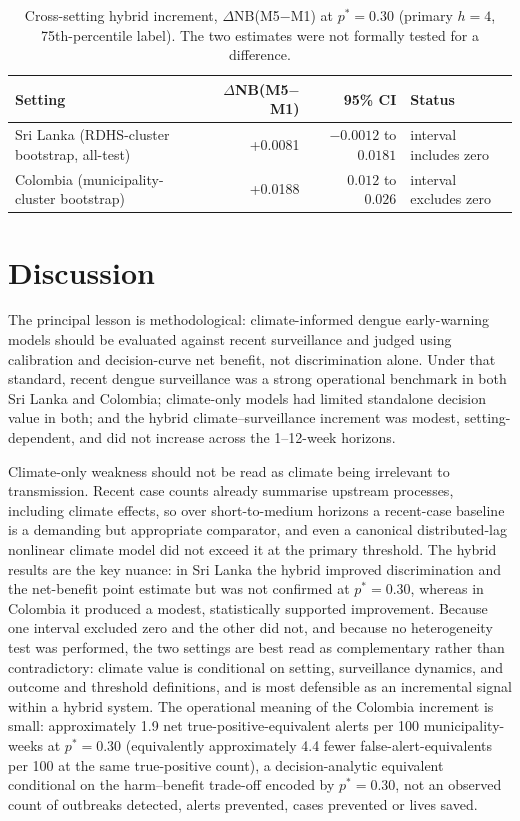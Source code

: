\documentclass[11pt,a4paper]{article}
\begin{document}
\begin{table}[htbp]
\centering
\caption{Cross-setting hybrid increment, $\Delta$NB(M5$-$M1) at $p^*=0.30$ (primary $h=4$, 75th-percentile label). The two estimates were not formally tested for a difference.}
\label{tab:crosssetting}
\small
\begin{tabular}{lrrl}
\toprule
Setting & $\Delta$NB(M5$-$M1) & 95\% CI & Status \\
\midrule
Sri Lanka (RDHS-cluster bootstrap, all-test) & +0.0081 & $-0.0012$ to $0.0181$ & interval includes zero \\
Colombia (municipality-cluster bootstrap) & +0.0188 & $0.012$ to $0.026$ & interval excludes zero \\
\bottomrule
\end{tabular}
\end{table}

\section{Discussion}

The principal lesson is methodological: climate-informed dengue early-warning models should be evaluated against recent surveillance and judged using calibration and decision-curve net benefit, not discrimination alone. Under that standard, recent dengue surveillance was a strong operational benchmark in both Sri Lanka and Colombia; climate-only models had limited standalone decision value in both; and the hybrid climate--surveillance increment was modest, setting-dependent, and did not increase across the 1--12-week horizons.

Climate-only weakness should not be read as climate being irrelevant to transmission. Recent case counts already summarise upstream processes, including climate effects, so over short-to-medium horizons a recent-case baseline is a demanding but appropriate comparator, and even a canonical distributed-lag nonlinear climate model did not exceed it at the primary threshold. The hybrid results are the key nuance: in Sri Lanka the hybrid improved discrimination and the net-benefit point estimate but was not confirmed at $p^*=0.30$, whereas in Colombia it produced a modest, statistically supported improvement. Because one interval excluded zero and the other did not, and because no heterogeneity test was performed, the two settings are best read as complementary rather than contradictory: climate value is conditional on setting, surveillance dynamics, and outcome and threshold definitions, and is most defensible as an incremental signal within a hybrid system. The operational meaning of the Colombia increment is small: approximately 1.9 net true-positive-equivalent alerts per 100 municipality-weeks at $p^*=0.30$ (equivalently approximately 4.4 fewer false-alert-equivalents per 100 at the same true-positive count), a decision-analytic equivalent conditional on the harm--benefit trade-off encoded by $p^*=0.30$, not an observed count of outbreaks detected, alerts prevented, cases prevented or lives saved.
\end{document}
